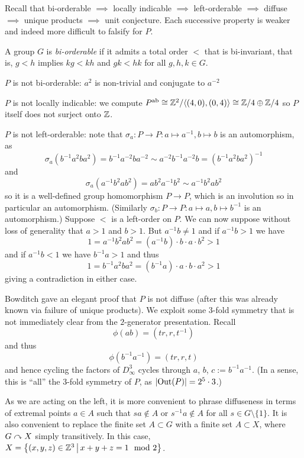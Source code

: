 Recall that bi-orderable $\implies$ locally indicable $\implies$ left-orderable $\implies$ diffuse $\implies$ unique products $\implies$ unit conjecture.
Each successive property is weaker and indeed more difficult to falsify for $P$.

\begin{definition}
    A group $G$ is \emph{bi-orderable} if it admits a total order $<$ that is bi-invariant, that is, $g < h$ implies $kg < kh$ and $gk < hk$ for all $g, h, k \in G$.
\end{definition}

$P$ is not bi-orderable: $a^2$ is non-trivial and conjugate to $a^{-2}$

$P$ is not locally indicable: we compute $P^{\text{ab}} \cong \mathbb{Z}^2 / \langle (4, 0), (0, 4) \rangle \cong \mathbb{Z}/4 \oplus \mathbb{Z}/4$ so $P$ itself does not surject onto $\mathbb{Z}$.

$P$ is not left-orderable: note that $\sigma_a \colon P \to P \colon a \mapsto a^{-1}, b \mapsto b$ is an automorphism, as \[
    \sigma_a(b^{-1} a^2 b a^2) = b^{-1} a^{-2} b a^{-2} \sim a^{-2} b^{-1} a^{-2} b = (b^{-1} a^2 b a^2)^{-1}
\] and \[
    \sigma_a(a^{-1} b^2 a b^2) = a b^2 a^{-1} b^2 \sim a^{-1} b^2 a b^2
\] so it is a well-defined group homomorphism $P \to P$, which is an involution so in particular an automorphism.
(Similarly $\sigma_b \colon P \to P \colon a \mapsto a, b \mapsto b^{-1}$ is an automorphism.)
Suppose $<$ is a left-order on $P$.
We can now suppose without loss of generality that $a > 1$ and $b > 1$.
But $a^{-1} b \neq 1$ and if $a^{-1} b > 1$ we have \[
    1 = a^{-1} b^2 a b^2 = (a^{-1} b) \cdot b \cdot a \cdot b^2 > 1
\] and if $a^{-1} b < 1$ we have $b^{-1} a > 1$ and thus \[
    1 = b^{-1} a^2 b a^2 = (b^{-1} a) \cdot a \cdot b \cdot a^2 > 1
\] giving a contradiction in either case.

Bowditch gave an elegant proof that $P$ is not diffuse (after this was already known via failure of unique products).
We exploit some $3$-fold symmetry that is not immediately clear from the $2$-generator presentation. Recall \[
    \phi(ab) = (tr, r, t^{-1})
\] and thus \[
    \phi(b^{-1} a^{-1}) = (tr, r, t)
\] and hence cycling the factors of $D_\infty^3$ cycles through $a$, $b$, $c := b^{-1} a^{-1}$.
(In a sense, this is ``all'' the $3$-fold symmetry of $P$, as $\lvert \mathrm{Out}(P) \rvert = 2^5 \cdot 3$.)

As we are acting on the left, it is more convenient to phrase diffuseness in terms of extremal points $a \in A$ such that $sa \notin A$ or $s^{-1} a \notin A$ for all $s \in G \setminus \{1\}$.
It is also convenient to replace the finite set $A \subset G$ with a finite set $A \subset X$, where $G \curvearrowright X$ simply transitively.
In this case, $X = \left\{ (x, y, z) \in \mathbb{Z}^3 \,\middle|\, x + y + z = 1 \mod 2 \right\}$.

